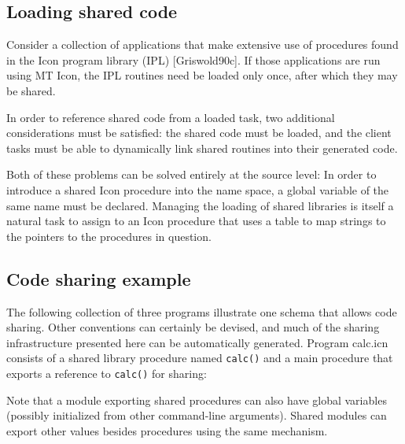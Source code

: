 \subsection{Loading shared code}

Consider a collection of applications that make extensive use of
procedures found in the Icon program library (IPL) [Griswold90c]. If
those applications are run using MT Icon, the IPL routines need be
loaded only once, after which they may be shared.

In order to reference shared code from a loaded task, two additional
considerations must be satisfied: the shared code must be loaded, and
the client tasks must be able to dynamically link shared routines into
their generated code.

Both of these problems can be solved entirely at the source level: In
order to introduce a shared Icon procedure into the name space, a
global variable of the same name must be declared. Managing the
loading of shared libraries is itself a natural task to assign to an
Icon procedure that uses a table to map strings to the pointers to the
procedures in question.

\subsection{Code sharing example}

The following collection of three programs illustrate one schema that allows
code sharing. Other conventions can certainly be devised, and much of the
sharing infrastructure presented here can be automatically generated. Program
calc.icn consists of a shared library procedure named {\texttt{calc()}} and a
main procedure that exports a reference to {\texttt{calc()}} for sharing:


Note that a module exporting shared procedures can also have global
variables (possibly initialized from other command-line arguments).
Shared modules can export other values besides procedures using the
same mechanism.

